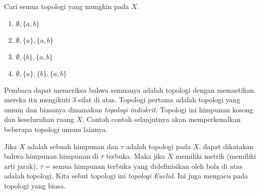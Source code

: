 \documentclass{book}
\begin{document}
\begin{contoh}
Cari semua topologi yang mungkin pada $X$.
\begin{enumerate}
\item $\emptyset, \{a,b\}$
\item $\emptyset, \{a\}, \{a,b\}$
\item $\emptyset, \{b\}, \{a,b\}$
\item $\emptyset, \{a\}, \{b\}, \{a,b\}$
\end{enumerate}
\end{contoh}
\noindent Pembaca dapat memeriksa bahwa semuanya adalah topologi dengan memastikan mereka itu mengikuti 3 sifat di atas. Topologi pertama adalah topologi yang umum dan biasanya dinamakan \emph{topologi indiskrit}. Topologi ini himpunan kosong dan keseluruhan ruang $X$. Contoh contoh selanjutnya akan memperkenalkan beberapa topologi umum lainnya.
\begin{contoh}
Jika $X$ adalah sebuah himpunan dan $\tau$ adalah topologi pada $X$, dapat dikatakan bahwa himpunan himpunan di $\tau$ terbuka. Maka jika $X$ memiliki metrik (memiliki arti jarak), $\tau = \text{semua himpunan terbuka yang didefinisikan oleh bola di atas}$ adalah topologi. Kita sebut topologi ini \emph{topologi Euclid}. Ini juga mengacu pada topologi yang biasa.
\end{contoh}
\end{document}
